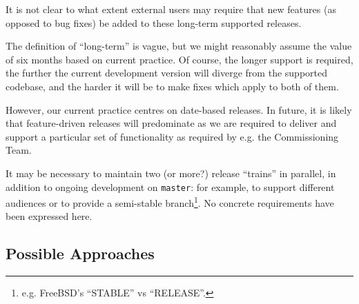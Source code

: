 \documentclass[letterpaper]{scrartcl}
\begin{document}
It is not clear to what extent external users may require that new features
(as opposed to bug fixes) be added to these long-term supported releases.

The definition of ``long-term'' is vague, but we might reasonably assume the
value of six months based on current practice. Of course, the longer support
is required, the further the current development version will diverge from the
supported codebase, and the harder it will be to make fixes which apply to
both of them.

However, our current practice centres on date-based releases. In future, it
is likely that feature-driven releases will predominate as we are required to
deliver and support a particular set of functionality as required by e.g. the
Commissioning Team.

It may be necessary to maintain two (or more?) release ``trains'' in parallel,
in addition to ongoing development on \texttt{master}: for example, to support
different audiences or to provide a semi-stable branch\footnote{e.g. FreeBSD's
``STABLE'' vs ``RELEASE''.}. No concrete requirements have been expressed
here.

\subsection{Possible Approaches}
\end{document}
